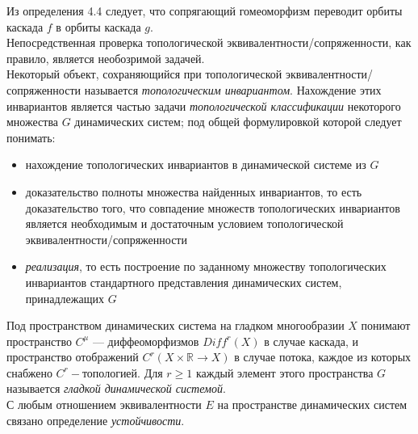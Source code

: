 \noindent Из определения 4.4 следует, что сопрягающий гомеоморфизм переводит орбиты каскада \(f\)
в орбиты каскада \(g\). 
\\[2mm]
Непосредственная проверка топологической эквивалентности/сопряженности, как правило, является необозримой задачей. 
\\[2mm]
Некоторый объект, сохраняющийся при топологической эквивалентности/сопряженности называется \textit{топологическим инвариантом}. 
Нахождение этих инвариантов является частью задачи \textit{топологической классификации} некоторого множества \(G\) динамических систем;
под общей формулировкой которой следует понимать:
\begin{itemize}
    \item нахождение топологических инвариантов в динамической системе из \(G\)
    \item доказательство полноты множества найденных инвариантов, то есть доказательство того, что совпадение множеств топологических инвариантов является необходимым и достаточным условием топологической эквивалентности/сопряженности
    \item \textit{реализация}, то есть построение по заданному множеству топологических инвариантов стандартного представления динамических систем, принадлежащих \(G\)
\end{itemize}

\noindent Под пространством динамических система на гладком многообразии \(X\) понимают пространство \(C^\mu\) --- диффеоморфизмов \({Diff}^{r}(X)\) в случае каскада, и пространство отображений \(C^r(X\times \mathbb{R} \to X)\)
в случае потока, каждое из которых снабжено \(C^r - \text{топологией}\). Для \(r\geq 1\) каждый элемент этого пространства \(G\) называется \textit{гладкой динамической системой}. 
\\[2mm]
С любым отношением эквивалентности \(E\) на пространстве динамических систем связано определение \textit{устойчивости}. 


